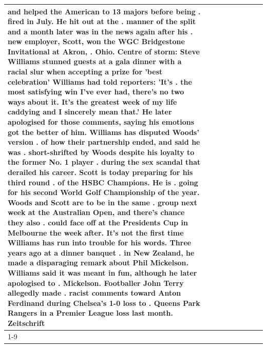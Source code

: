 \begin{table}[H]
\begin{tabular}{lllrlllll}
and helped the American to 13 majors before being . fired in July. He hit out at the . manner of the split and a month later was in the news again after his . new employer, Scott, won the WGC Bridgestone Invitational at Akron, . Ohio. Centre of storm: Steve Williams stunned guests at a gala dinner with a racial slur when accepting a prize for 'best celebration' Williams had told reporters: 'It's . the most satisfying win I've ever had, there's no two ways about it. It's the greatest week of my life caddying and I sincerely mean that.' He later apologised for those comments, saying his emotions got the better of him. Williams has disputed Woods' version . of how their partnership ended, and said he was . short-shrifted by Woods despite his loyalty to the former No. 1 player . during the sex scandal that derailed his career. Scott is today preparing for his third round . of the HSBC Champions. He is . going for his second World Golf Championship of the year. Woods and Scott are to be in the same . group next week at the Australian Open, and there's chance they also . could face off at the Presidents Cup in Melbourne the week after. It's not the first time Williams has run into trouble for his words. Three years ago at a dinner banquet . in New Zealand, he made a disparaging remark about Phil Mickelson. Williams said it was meant in fun, although he later apologised to . Mickelson. Footballer John Terry allegedly made . racist comments toward Anton Ferdinand during Chelsea's 1-0 loss to . Queens Park Rangers in a Premier League loss last month. Zeitschrift \\
\cline{1-9}

\end{tabular}
\end{table}

